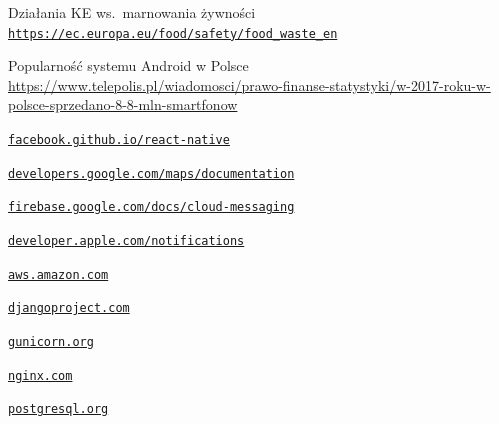 \documentclass[licencjacka]{pracamgr}
\begin{document}
\begin{thebibliography}{99}
 Działania KE ws.\ marnowania żywności\\ \href{https://ec.europa.eu/food/safety/food_waste_en}{\texttt{https://ec.europa.eu/food/safety/food\_waste\_en}}

 Popularność systemu Android w Polsce\\ 
\href{https://www.telepolis.pl/wiadomosci/prawo-finanse-statystyki/w-2017-roku-w-polsce-sprzedano-8-8-mln-smartfonow}{https://www.telepolis.pl/wiadomosci/prawo-finanse-statystyki/w-2017-roku-w-polsce-sprzedano-8-8-mln-smartfonow}

 \href{https://facebook.github.io/react-native/}{\texttt{facebook.github.io/react-native}}

 \href{https://developers.google.com/maps/documentation/}{\texttt{developers.google.com/maps/documentation}}

 \href{https://firebase.google.com/docs/cloud-messaging/}{\texttt{firebase.google.com/docs/cloud-messaging}}

 \href{https://developer.apple.com/notifications/}{\texttt{developer.apple.com/notifications}}

 \href{https://aws.amazon.com/}{\texttt{aws.amazon.com}}

 \href{https://www.djangoproject.com/}{\texttt{djangoproject.com}}

 \href{https://gunicorn.org/}{\texttt{gunicorn.org}}

 \href{https://www.nginx.com/}{\texttt{nginx.com}}

 \href{https://www.postgresql.org/}{\texttt{postgresql.org}}


\end{thebibliography}
\end{document}
